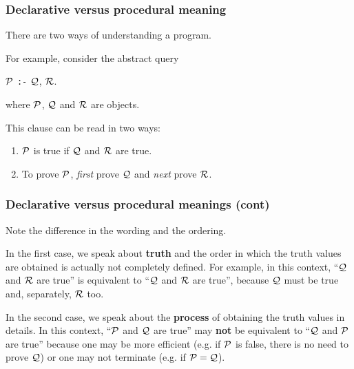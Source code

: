 
%
\begin{frame}[containsverbatim]
\frametitle{Declarative versus procedural meaning}

There are two ways of understanding a \Prolog program.

\bigskip

For example, consider the abstract query

\bigskip

{\small \(\cal P\) \verb|:-| \(\cal Q\), \(\cal R\).}

\bigskip

where \(\cal P\), \(\cal Q\) and \(\cal R\) are objects.

\bigskip

This clause can be read in two ways:
\begin{enumerate}

  \item \(\cal P\) is true if \(\cal Q\) and \(\cal R\) are true.

  \item To prove \(\cal P\), \emph{first} prove \(\cal Q\) and
    \emph{next} prove \(\cal R\).

\end{enumerate}

\end{frame}

%
\begin{frame}
\frametitle{Declarative versus procedural meanings (cont)}

Note the difference in the wording and the ordering.

\bigskip

In the first case, we speak about \textbf{truth} and the order in
which the truth values are obtained is actually not completely
defined. For example, in this context, ``\(\cal Q\) and \(\cal R\) are
true'' is equivalent to ``\(\cal Q\) and \(\cal R\) are true'',
because \(\cal Q\) must be true and, separately, \(\cal R\) too.

\bigskip

In the second case, we speak about the \textbf{process} of obtaining
the truth values in details. In this context, ``\(\cal P\) and \(\cal
Q\) are true'' may \textbf{not} be equivalent to ``\(\cal Q\) and
\(\cal P\) are true'' because one may be more efficient (e.g. if
\(\cal P\) is false, there is no need to prove \(\cal Q\)) or one may
not terminate (e.g. if \({\cal P} = {\cal Q}\)).

\end{frame}

